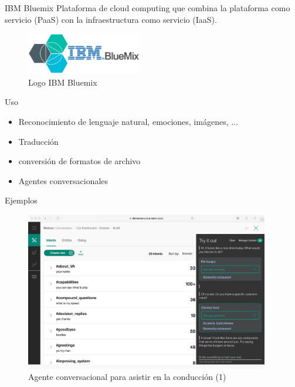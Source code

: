 \documentclass[compress]{beamer}
\begin{document}
\begin{frame}{IBM Bluemix}
	Plataforma de cloud computing que combina la plataforma como servicio
	(PaaS) con la infraestructura como servicio (IaaS).
	\begin{figure}[H]
		\centering
		\label{ibm-bluemix.jpg}
		\includegraphics[width=0.45\textwidth]{./Imagenes/ibm-bluemix.jpg}
		\caption{Logo IBM Bluemix}
	\end{figure}

	\begin{exampleblock}{Uso}
		\begin{itemize}
			\item Reconocimiento de lenguaje natural, emociones, imágenes, ...
			\item Traducción
			\item conversión de formatos de archivo
			\item Agentes conversacionales
		\end{itemize}
	\end{exampleblock}
\end{frame}


\begin{frame}{Ejemplos}
	\begin{figure}[H]
		\centering
		\label{car1.jpg}
		\includegraphics[width=0.95\textwidth]{./Imagenes/car1.jpeg}
		\caption{Agente conversacional para asistir en la conducción (1)}
	\end{figure}
\end{frame}
\end{document}
